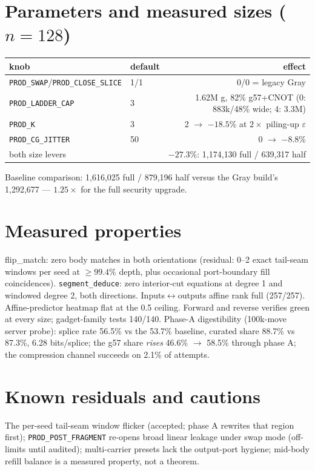 \documentclass[11pt]{article}
\begin{document}
\section{Parameters and measured sizes ($n=128$)}
\begin{center}
\begin{tabular}{llr}
\toprule
knob & default & effect \\
\midrule
\texttt{PROD\_SWAP}/\texttt{PROD\_CLOSE\_SLICE} & 1/1 & 0/0 = legacy Gray \\
\texttt{PROD\_LADDER\_CAP} & 3 & 1.62M g, 82\% g57+CNOT (0: 883k/48\% wide; 4: 3.3M) \\
\texttt{PROD\_K} & 3 & 2 $\to$ $-18.5\%$ at $2\times$ piling-up $\varepsilon$ \\
\texttt{PROD\_CG\_JITTER} & 50 & 0 $\to$ $-8.8\%$ \\
both size levers & & $-27.3\%$: 1{,}174{,}130 full / 639{,}317 half \\
\bottomrule
\end{tabular}
\end{center}

\noindent Baseline comparison: 1{,}616{,}025 full / 879{,}196 half
versus the Gray build's 1{,}292{,}677 --- $1.25\times$ for the full
security upgrade.

\section{Measured properties}
flip\_match: zero body matches in both orientations (residual: 0--2
exact tail-seam windows per seed at $\ge 99.4\%$ depth, plus occasional
port-boundary fill coincidences). \texttt{segment\_deduce}: zero
interior-cut equations at degree 1 and windowed degree 2, both
directions. Inputs$\leftrightarrow$outputs affine rank full (257/257).
Affine-predictor heatmap flat at the 0.5 ceiling. Forward and reverse
verifies green at every size; gadget-family tests 140/140. Phase-A
digestibility (100k-move server probe): splice rate 56.5\% vs the 53.7\%
baseline, curated share 88.7\% vs 87.3\%, 6.28 bits/splice; the g57
share \emph{rises} 46.6\% $\to$ 58.5\% through phase A; the compression
channel succeeds on 2.1\% of attempts.

\section{Known residuals and cautions}
The per-seed tail-seam window flicker (accepted; phase A rewrites that
region first); \texttt{PROD\_POST\_FRAGMENT} re-opens broad linear
leakage under swap mode (off-limits until audited); multi-carrier
presets lack the output-port hygiene; mid-body refill balance is a
measured property, not a theorem.
\end{document}
